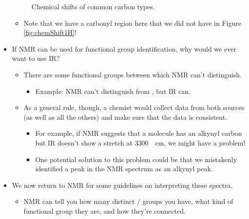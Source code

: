 \documentclass[../notes.tex]{subfiles}
\begin{document}
\begin{itemize}
\begin{figure}[h!]
        \caption{Chemical shifts of common carbon types.}
        \label{fig:chemShift13C}
    \end{figure}
    \begin{itemize}
        \item Note that we have a carbonyl region here that we did not have in Figure \ref{fig:chemShift1H}!
    \end{itemize}
    \item If  NMR can be used for functional group identification, why would we ever want to use IR?
    \begin{itemize}
        \item There are some functional groups between which  NMR can't distinguish.
        \begin{itemize}
            \item Example:  NMR can't distinguish  from , but IR can.
        \end{itemize}
        \item As a general rule, though, a chemist would collect data from both sources (as well as all the others) and make sure that the data is consistent.
        \begin{itemize}
            \item For example, if  NMR suggests that a molecule has an alkynyl carbon but IR doesn't show a stretch at \SI{3300}{\per\centi\meter}, we might have a problem!
            \item One potential solution to this problem could be that we mistakenly identified a  peak in the  NMR spectrum as an alkynyl peak.
        \end{itemize}
    \end{itemize}
    \item We now return to  NMR for some guidelines on interpreting these spectra.
    \begin{itemize}
        \item NMR can tell you how many distinct / groups you have, what kind of functional group they are, and how they're connected.

\end{itemize}
\end{itemize}
\end{document}
